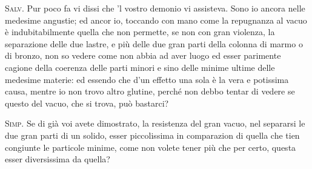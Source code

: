 \documentclass[11pt,twoside,openany]{book}
\newcommand{\speaker}[1]{\textcolor{rubric}{\textsc{#1}}\space}
\begin{document}
\speaker{Salv.} Pur poco fa vi dissi che 'l vostro demonio vi assisteva. Sono io ancora nelle medesime angustie; ed ancor io, toccando con mano come la repugnanza al vacuo è indubitabilmente quella che non permette, se non con gran violenza, la separazione delle due lastre, e più delle due gran parti della colonna di marmo o di bronzo, non so vedere come non abbia ad aver luogo ed esser parimente cagione della coerenza delle parti minori e sino delle minime ultime delle medesime materie: ed essendo che d'un effetto una sola è la vera e potissima causa, mentre io non trovo altro glutine, perché non debbo tentar di vedere se questo del vacuo, che si trova, può bastarci?

\speaker{Simp.} Se di già voi avete dimostrato, la resistenza del gran vacuo, nel separarsi le due gran parti di un solido, esser piccolissima in comparazion di quella che tien congiunte le particole minime, come non volete tener più che per certo, questa esser diversissima da quella?
\end{document}
